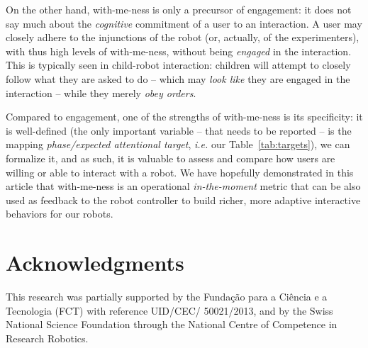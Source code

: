 \documentclass{sig-alternate}
\newcommand{\ie}{\textit{i.e.}\xspace}
\begin{document}
On the other hand, with-me-ness is only a precursor of engagement: it does not
say much about the \emph{cognitive} commitment of a user to an interaction. A
user may closely adhere to the injunctions of the robot (or, actually, of the
experimenters), with thus high levels of with-me-ness,  without being
\emph{engaged} in the interaction. This is typically seen in child-robot
interaction: children will attempt to closely follow what they are asked to do
-- which may \emph{look like} they are engaged in the interaction -- while they
merely \emph{obey orders}.

Compared to engagement, one of the strengths of with-me-ness is its specificity:
it is well-defined (the only important variable -- that needs to be reported --
is the mapping {\it phase/expected attentional target}, \ie our
Table~\ref{tab:targets}), we can formalize it, and as such, it is valuable to
assess and compare how users are willing or able to interact with a robot.  We
have hopefully demonstrated in this article that with-me-ness is an operational
\emph{in-the-moment} metric that can be also used as feedback to the robot
controller to build richer, more adaptive interactive behaviors for our robots.

\section*{Acknowledgments}

This research was partially supported by the Funda\c{c}\~{a}o para a Ci\^{e}ncia
e a Tecnologia (FCT) with reference UID/CEC/ 50021/2013, and by the Swiss
National Science Foundation through the National Centre of Competence in
Research Robotics.



\end{document}
